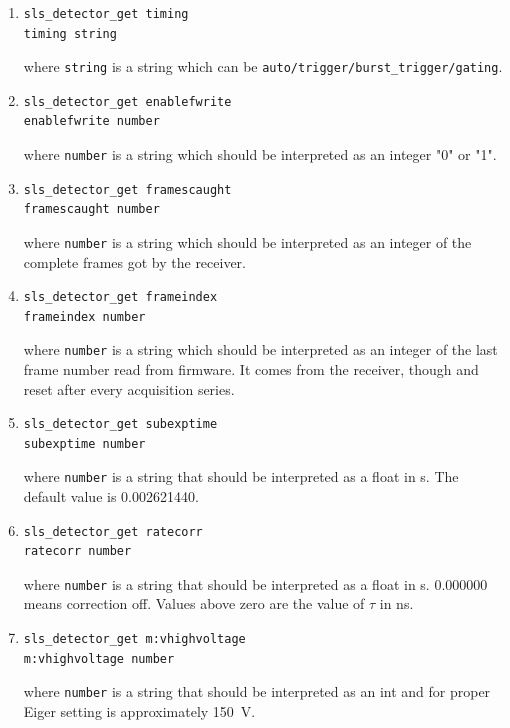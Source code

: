 \documentclass{article}
\begin{document}
\begin{enumerate}
\item \begin{verbatim}
sls_detector_get timing 
timing string
\end{verbatim}
where {\tt{string}} is a string which can be {\tt{auto/trigger/burst\_trigger/gating}}.

\item \begin{verbatim}
sls_detector_get enablefwrite
enablefwrite number
\end{verbatim}
where {\tt{number}} is a string which should be interpreted as an integer "0" or "1".

\item \begin{verbatim}
sls_detector_get framescaught
framescaught number
\end{verbatim}
where {\tt{number}} is a string which should be interpreted as an integer of the complete frames got by the receiver.

\item \begin{verbatim}
sls_detector_get frameindex
frameindex number
\end{verbatim}
where {\tt{number}} is a string which should be interpreted as an integer of the last frame number read from firmware. It comes from the receiver, though and reset after every acquisition series.

\item \begin{verbatim}
sls_detector_get subexptime
subexptime number
\end{verbatim}
where {\tt{number}} is a string that should be interpreted as a float in s. The default value is 0.002621440. 

\item \begin{verbatim}
sls_detector_get ratecorr
ratecorr number
\end{verbatim}
where {\tt{number}} is a string that should be interpreted as a float in s.  0.000000 means correction off. Values above zero are the value of $\tau$ in ns.

\item \begin{verbatim}
sls_detector_get m:vhighvoltage
m:vhighvoltage number
\end{verbatim}
where {\tt{number}} is a string that should be interpreted as an int and for proper Eiger setting is approximately 150~V.  

\end{enumerate}
\end{document}
